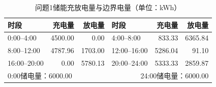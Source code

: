 \begin{table}[H]\centering\small
\caption{问题1储能充放电量与边界电量（单位：kWh）}
\label{tab:q1_storage}
\begin{tabular}{lrrlrr}\toprule
时段 & 充电量 & 放电量 & 时段 & 充电量 & 放电量\\\midrule
0:00--4:00 & 4500.00 & 0.00 & 4:00--8:00 & 833.33 & 6365.84 \\
8:00--12:00 & 4787.96 & 1703.00 & 12:00--16:00 & 5286.04 & 91.10 \\
16:00--20:00 & 0.00 & 5780.13 & 20:00--24:00 & 5333.33 & 2859.87 \\
\midrule\multicolumn{3}{l}{0:00储电量：6000.00} & \multicolumn{3}{r}{24:00储电量：6000.00}\\
\bottomrule\end{tabular}\end{table}
